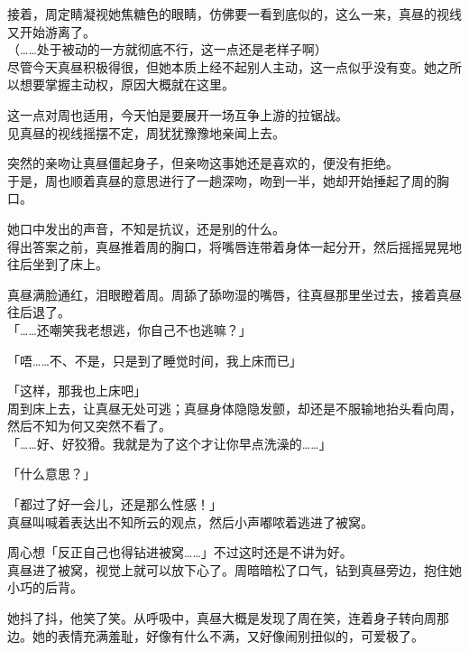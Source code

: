 接着，周定睛凝视她焦糖色的眼睛，仿佛要一看到底似的，这么一来，真昼的视线又开始游离了。\\

（……处于被动的一方就彻底不行，这一点还是老样子啊）\\

尽管今天真昼积极得很，但她本质上经不起别人主动，这一点似乎没有变。她之所以想要掌握主动权，原因大概就在这里。

这一点对周也适用，今天怕是要展开一场互争上游的拉锯战。\\

见真昼的视线摇摆不定，周犹犹豫豫地亲闻上去。

突然的亲吻让真昼僵起身子，但亲吻这事她还是喜欢的，便没有拒绝。\\

于是，周也顺着真昼的意思进行了一趟深吻，吻到一半，她却开始捶起了周的胸口。

她口中发出的声音，不知是抗议，还是别的什么。\\

得出答案之前，真昼推着周的胸口，将嘴唇连带着身体一起分开，然后摇摇晃晃地往后坐到了床上。

真昼满脸通红，泪眼瞪着周。周舔了舔吻湿的嘴唇，往真昼那里坐过去，接着真昼往后退了。\\

「……还嘲笑我老想逃，你自己不也逃嘛？」

「唔……不、不是，只是到了睡觉时间，我上床而已」

「这样，那我也上床吧」\\

周到床上去，让真昼无处可逃；真昼身体隐隐发颤，却还是不服输地抬头看向周，然后不知为何又突然不看了。\\

「……好、好狡猾。我就是为了这个才让你早点洗澡的……」

「什么意思？」

「都过了好一会儿，还是那么性感！」\\

真昼叫喊着表达出不知所云的观点，然后小声嘟哝着逃进了被窝。

周心想「反正自己也得钻进被窝……」不过这时还是不讲为好。\\

真昼进了被窝，视觉上就可以放下心了。周暗暗松了口气，钻到真昼旁边，抱住她小巧的后背。

她抖了抖，他笑了笑。从呼吸中，真昼大概是发现了周在笑，连着身子转向周那边。她的表情充满羞耻，好像有什么不满，又好像闹别扭似的，可爱极了。\\

